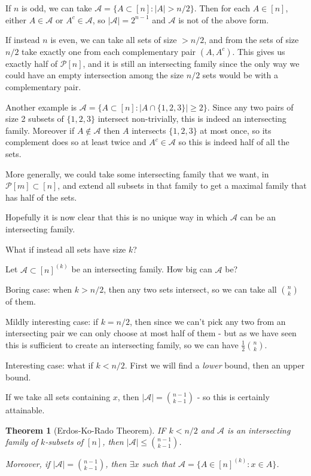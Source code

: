 \documentclass[]{article}
\theoremstyle{custhm}
\theoremstyle{cusdef}
\theoremstyle{custhm}
\theoremstyle{custhm}
\theoremstyle{custhm}
\theoremstyle{custhm}
\newtheorem*{theorem*}{Theorem}
\theoremstyle{cusdef}
\theoremstyle{remark}
\theoremstyle{custhm}
\renewcommand{\it}[1]{\textit{#1}}
\newcommand{\A}{\mathcal{A}}
\begin{document}
If $n$ is odd, we can take $\A = \{A\subset [n]:|A| > n/2\}$. Then for each $A\in [n]$, either $A\in \A$ or $A^c \in \A$, so $|\A| = 2^{n-1}$ and $\A$ is not of the above form.

If instead $n$ is even, we can take all sets of size $ > n/2$, and from the sets of size $n/2$ take exactly one from each complementary pair $(A,A^c)$. This gives us exactly half of $\mathcal{P}[n]$, and it is still an intersecting family since the only way we could have an empty intersection among the size $n/2$ sets would be with a complementary pair.

Another example is $\A = \{A\subset [n] : |A\cap\{1,2,3\}|\ge 2\}$. Since any two pairs of size 2 subsets of $\{1,2,3\}$ intersect non-trivially, this is indeed an intersecting family. Moreover if $A\not\in\A$ then $A$ intersects $\{1,2,3\}$ at most once, so its complement does so at least twice and $A^c\in\A$ so this is indeed half of all the sets.

More generally, we could take some intersecting family that we want, in $\mathcal{P}[m]\subset[n]$, and extend all subsets in that family to get a maximal family that has half of the sets.

Hopefully it is now clear that this is no unique way in which $\A$ can be an intersecting family.

What if instead all sets have size $k$?

Let $\A\subset [n]^{(k)}$ be an intersecting family. How big can $\A$ be?

Boring case: when $k > n/2$, then any two sets intersect, so we can take all ${n \choose k}$ of them.

Mildly interesting case: if $k = n/2$, then since we can't pick any two from an intersecting pair we can only choose at most half of them - but as we have seen this is sufficient to create an intersecting family, so we can have $\frac{1}{2}{n\choose k}$.

Interesting case: what if $k < n/2$. First we will find a \it{lower} bound, then an upper bound.

If we take all sets containing $x$, then $|\A| = {n-1\choose k-1}$ - so this is certainly attainable.

\begin{theorem*}[Erdos-Ko-Rado Theorem]
IF $k < n/2$ and $\A$ is an intersecting family of $k$-subsets of $[n]$, then $|\A| \le {n-1\choose k-1}$.

Moreover, if $|\A| = {n-1 \choose k-1}$, then $\exists x$ such that $\A = \{A\in [n]^{(k)}:x\in A\}$.
\end{theorem*}
\end{document}
